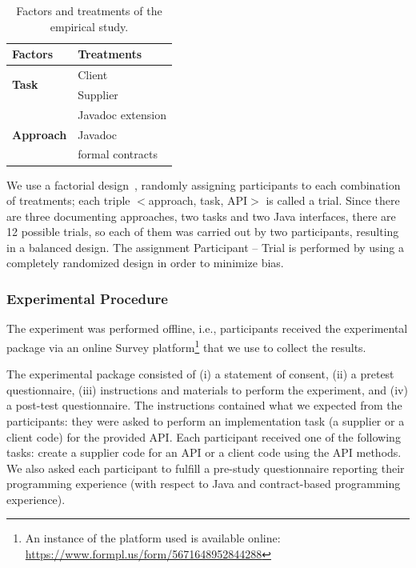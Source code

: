 \begin{table}[ht]
\caption{Factors and treatments of the empirical study.}
\label{tab:factorsEmpStudy}
\centering
\begin{tabular}{ll} \toprule
\bfseries Factors & \bfseries Treatments \\
\hline

\multirow{2}{*}{\textbf{Task}} & Client \\
& Supplier \\ \hline 

\multirow{3}{*}{\textbf{Approach}} & Javadoc extension \\
 & Javadoc \\
& formal contracts \\ \bottomrule
\end{tabular}
\end{table}

We use a factorial design~\cite{wohlin}, randomly assigning participants to each combination of treatments; each triple
$<$approach, task, API$>$ is called a trial.
Since there are three documenting approaches, two tasks and two Java interfaces, there are 12 possible trials, so each of them was carried out by two participants, resulting in a balanced design. 
The assignment Participant -- Trial is performed by using a
completely randomized design in order to minimize bias.


\subsubsection{Experimental Procedure}
\label{sec:expProcedure}

The experiment was performed offline, i.e., participants received the experimental package via an online Survey
platform\footnote{An instance of the platform used is
available online: \url{https://www.formpl.us/form/5671648952844288}} that we use to collect the results.

The experimental package consisted of (i) a statement of consent, (ii) a pretest
questionnaire, (iii) instructions and materials to perform the experiment, and (iv) a post-test
questionnaire. 
The instructions contained what we expected from the participants: they were asked to perform an implementation task (a supplier or a client code) for the
provided API. Each participant received one of the following tasks: create a supplier code for
an API or a client code using the API methods.
We also asked each participant to fulfill a
pre-study questionnaire reporting their programming experience (with respect to Java and contract-based programming experience). 

